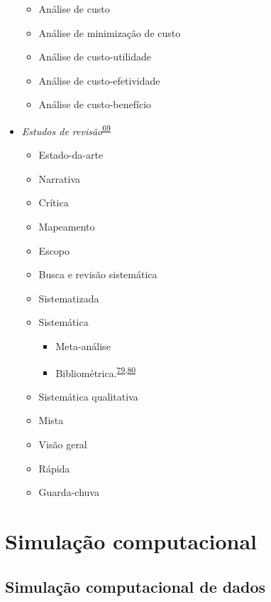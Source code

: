 \documentclass[
]{book}
\begin{document}
\begin{itemize}
  \begin{itemize}
  \item
    Análise de custo
  \item
    Análise de minimização de custo
  \item
    Análise de custo-utilidade
  \item
    Análise de custo-efetividade
  \item
    Análise de custo-benefício
  \end{itemize}
\item
  \emph{Estudos de revisão}\textsuperscript{\protect\hyperlink{ref-Grant2009}{69}}

  \begin{itemize}
  \item
    Estado-da-arte
  \item
    Narrativa
  \item
    Crítica
  \item
    Mapeamento
  \item
    Escopo
  \item
    Busca e revisão sistemática
  \item
    Sistematizada
  \item
    Sistemática

    \begin{itemize}
    \item
      Meta-análise
    \item
      Bibliométrica.\textsuperscript{\protect\hyperlink{ref-donthu2021}{79},\protect\hyperlink{ref-lim2023}{80}}
    \end{itemize}
  \item
    Sistemática qualitativa
  \item
    Mista
  \item
    Visão geral
  \item
    Rápida
  \item
    Guarda-chuva
  \end{itemize}
\end{itemize}

\hypertarget{simulacao-computacional}{%
\chapter{\texorpdfstring{\textbf{Simulação computacional}}{Simulação computacional}}\label{simulacao-computacional}}

\hypertarget{simulacao-computacional-dados}{%
\section{Simulação computacional de dados}\label{simulacao-computacional-dados}}
\end{document}
